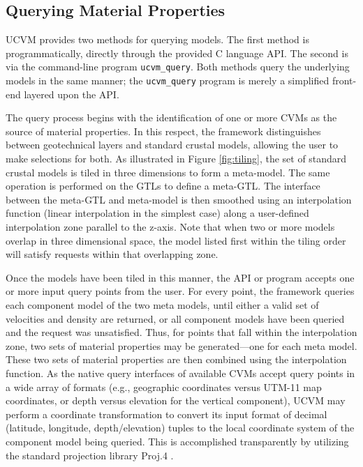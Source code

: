 


\subsection{Querying Material Properties}
\label{sec:querying}

UCVM provides two methods for querying models. The first method is programmatically, directly through the provided C language API. The second is via the command-line program \texttt{ucvm\_query}. Both methods query the underlying models in the same manner; the \texttt{ucvm\_query} program is merely a simplified front-end layered upon the API.

The query process begins with the identification of one or more CVMs as the source of material properties. In this respect, the framework distinguishes between geotechnical layers and standard crustal models, allowing the user to make selections for both. As illustrated in Figure \ref{fig:tiling}, the set of standard crustal models is tiled in three dimensions to form a meta-model. The same operation is performed on the GTLs to define a meta-GTL. The interface between the meta-GTL and meta-model is then smoothed using an interpolation function (linear interpolation in the simplest case) along a user-defined interpolation zone parallel to the z-axis. Note that when two or more models overlap in three dimensional space, the model listed first within the tiling order will satisfy requests within that overlapping zone.

Once the models have been tiled in this manner, the API or program accepts one or more input query points from the user. For every point, the framework queries each component model of the two meta models, until either a valid set of velocities and density are returned, or all component models have been queried and the request was unsatisfied. Thus, for points that fall within the interpolation zone, two sets of material properties may be generated---one for each meta model. These two sets of material properties are then combined using the interpolation function. As the native query interfaces of available CVMs accept query points in a wide array of formats (e.g., geographic coordinates versus UTM-11 map coordinates, or depth versus elevation for the vertical component), UCVM may perform a coordinate transformation to convert its input format of decimal (latitude, longitude, depth/elevation) tuples to the local coordinate system of the component model being queried. This is accomplished transparently by utilizing the standard projection library Proj.4 \citep{Evenden_2003_Manual}.

